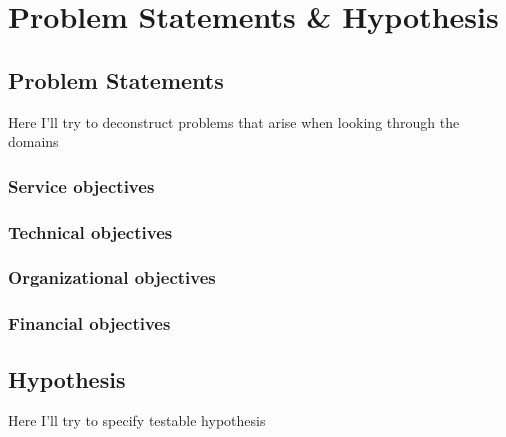 \documentclass[signatures]{Thesis}
\begin{document}




\tableofcontents
\newpage





\chapter{Problem Statements \& Hypothesis}
\section{Problem Statements}
  	Here I'll try to deconstruct problems that arise when looking through the domains
  	\subsection{Service objectives}
    \subsection{Technical objectives}
    \subsection{Organizational objectives}
    \subsection{Financial objectives}
  \section{Hypothesis}
  	Here I'll try to specify testable hypothesis
\end{document}
